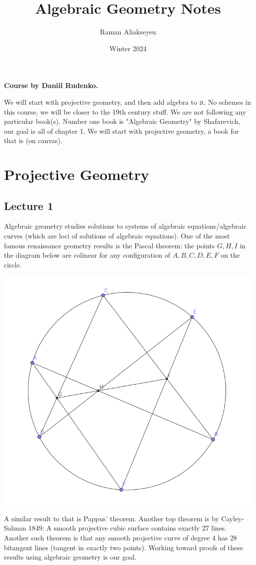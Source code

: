 \documentclass[12pt]{article}
\title{Algebraic Geometry Notes}
\author{Raman Aliakseyeu}
\date{Winter 2024}
\begin{document}
    \maketitle
    \noindent \textbf{Course by Daniil Rudenko.} \par 
    We will start with projective geometry, and then add algebra to it. No schemes in this course, we will be closer to the 19th century stuff. We are not following any particular book(s). Number one book is "Algebraic Geometry" by Shafarevich, our goal is all of chapter 1. We will start with projective geometry, a book for that is (on canvas). 
    \section{Projective Geometry} 
    \subsection{Lecture 1} 
        Algebraic geometry studies solutions to systems of algebraic equations/algebraic curves (which are loci of solutions of algebraic equations). One of the most famous renaissance geometry results is the Pascal theorem: the points $G, H, I$ in the diagram below are colinear for any configuration of $A, B, C, D, E, F$ on the circle. 
        \begin{center}
            \includegraphics[width = 0.5 \linewidth]{pascals-theorem.PNG}
        \end{center}
        A similar result to that is Pappus' theorem. Another top theorem is by Cayley-Salman 1849: A smooth projective cubic surface contains exactly 27 lines. Another such theorem is that any smooth projective curve of degree 4 has 28 bitangent lines (tangent in exactly two points). Working toward proofs of these results using algebraic geometry is our goal. \par 
\end{document}
